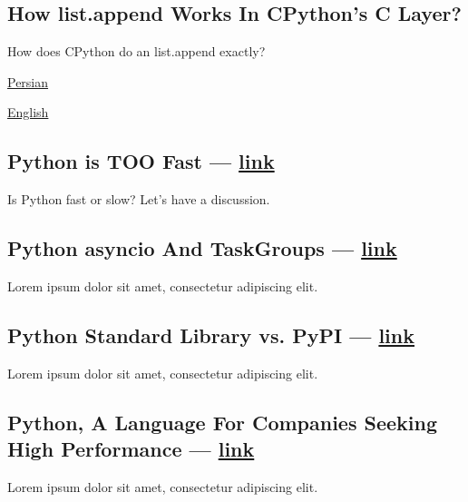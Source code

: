 \begin{multicols}{2}
\subsection{{How list.append Works In CPython's C Layer?}}
\begin{zitemize}
\item How does CPython do an {\ttfamily list.append} exactly?
\item \href{https://virgool.io/@liewpl/how-append-works-gp4apwtpr0bt}{Persian}
\item \href{https://medium.com/@mahdihaghverdi/how-list-append-is-implemented-in-c-layer-of-cpython-interpreter-bf88632819c0}{English}
\end{zitemize}

\subsection{{Python is TOO Fast --- \href{https://virgool.io/@liewpl/python-is-very-fast-gmmdjs3zyhob}{link}}}
\begin{zitemize}
\item Is Python fast or slow? Let's have a discussion.
\end{zitemize}

\subsection{{Python asyncio And TaskGroups --- \href{https://virgool.io/@liewpl/asyncio-and-taskgroups-t598c8poken9}{link}}}
\begin{zitemize}
\item Lorem ipsum dolor sit amet, consectetur adipiscing elit.
\end{zitemize}

\subsection{{Python Standard Library vs. PyPI --- \href{https://virgool.io/@liewpl/asyncio-and-taskgroups-t598c8poken9}{link}}}
\begin{zitemize}
\item Lorem ipsum dolor sit amet, consectetur adipiscing elit.
\end{zitemize}

\subsection{{Python, A Language For Companies Seeking High Performance --- \href{https://vrgl.ir/29p56}{link}}}
\begin{zitemize}
\item Lorem ipsum dolor sit amet, consectetur adipiscing elit.
\end{zitemize}


\end{multicols}
